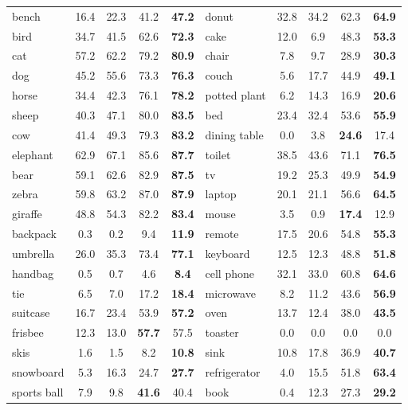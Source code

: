 \documentclass[10pt,twocolumn,letterpaper]{article}
\begin{document}
\begin{table*}[t]
\begin{scriptsize}
\begin{tabular}{
    p{} c c c c | p{} c c c c}
    bench & 16.4 & 22.3 & 41.2 & \textbf{47.2} & donut & 32.8 & 34.2 & 62.3 & \textbf{64.9} \\
    bird & 34.7 & 41.5 & 62.6 & \textbf{72.3} & cake & 12.0 & 6.9 & 48.3 & \textbf{53.3} \\
    cat & 57.2 & 62.2 & 79.2 & \textbf{80.9} & chair & 7.8 & 9.7 & 28.9 & \textbf{30.3} \\
    dog & 45.2 & 55.6 & 73.3 & \textbf{76.3} & couch & 5.6 & 17.7 & 44.9 & \textbf{49.1} \\
    horse & 34.4 & 42.3 & 76.1 & \textbf{78.2} & potted plant & 6.2 & 14.3 & 16.9 & \textbf{20.6} \\
    sheep & 40.3 & 47.1 & 80.0 & \textbf{83.5} & bed & 23.4 & 32.4 & 53.6 & \textbf{55.9} \\
    cow & 41.4 & 49.3 & 79.3 & \textbf{83.2} & dining table & 0.0 & 3.8 & \textbf{24.6} & 17.4 \\
    elephant & 62.9 & 67.1 & 85.6 & \textbf{87.7} & toilet & 38.5 & 43.6 & 71.1 & \textbf{76.5} \\
    bear & 59.1 & 62.6 & 82.9 & \textbf{87.5} & tv & 19.2 & 25.3 & 49.9 & \textbf{54.9} \\
    zebra & 59.8 & 63.2 & 87.0 & \textbf{87.9} & laptop & 20.1 & 21.1 & 56.6 & \textbf{64.5} \\
    giraffe & 48.8 & 54.3 & 82.2 & \textbf{83.4} & mouse & 3.5 & 0.9 & \textbf{17.4} & 12.9 \\
    backpack & 0.3 & 0.2 & 9.4 & \textbf{11.9} & remote & 17.5 & 20.6 & 54.8 & \textbf{55.3} \\
    umbrella & 26.0 & 35.3 & 73.4 & \textbf{77.1} & keyboard & 12.5 & 12.3 & 48.8 & \textbf{51.8} \\
    handbag & 0.5 & 0.7 & 4.6 & \textbf{8.4} & cell phone & 32.1 & 33.0 & 60.8 & \textbf{64.6} \\
    tie & 6.5 & 7.0 & 17.2 & \textbf{18.4} & microwave & 8.2 & 11.2 & 43.6 & \textbf{56.9} \\
    suitcase & 16.7 & 23.4 & 53.9 & \textbf{57.2} & oven & 13.7 & 12.4 & 38.0 & \textbf{43.5} \\
    frisbee & 12.3 & 13.0 & \textbf{57.7} & 57.5 & toaster & 0.0 & 0.0 & 0.0 & 0.0 \\
    skis & 1.6 & 1.5 & 8.2 & \textbf{10.8} & sink & 10.8 & 17.8 & 36.9 & \textbf{40.7} \\
    snowboard & 5.3 & 16.3 & 24.7 & \textbf{27.7} & refrigerator & 4.0 & 15.5 & 51.8 & \textbf{63.4} \\
    sports ball & 7.9 & 9.8 & \textbf{41.6} & 40.4 & book & 0.4 & 12.3 & 27.3 & \textbf{29.2} \\

\end{tabular}
\end{scriptsize}
\end{table*}
\end{document}
